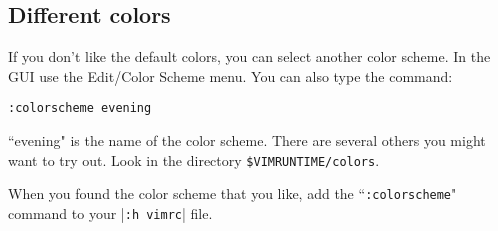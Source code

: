 \subsection{Different colors}
\label{syn-default-override}

If you don't like the default colors, you can select another color scheme.
In the GUI use the Edit/Color Scheme menu.
You can also type the command:

 \begin{Verbatim}[samepage=true]
 :colorscheme evening
 \end{Verbatim}

``evening" is the name of the color scheme.
There are several others you might want to try out.
Look in the directory \texttt{\$VIMRUNTIME/colors}.

When you found the color scheme that you like, add the ``\texttt{:colorscheme}" command to your |\texttt{:h vimrc}| file.

